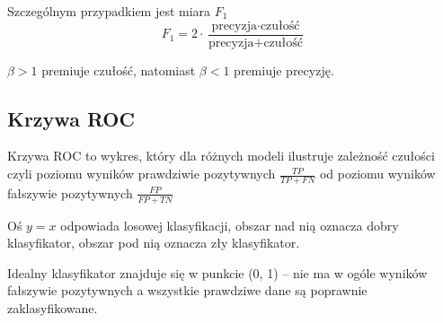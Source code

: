 Szczególnym przypadkiem jest miara \( F_1 \)
\[
	F_1 = 2 \cdot \frac{\text{precyzja} \cdot \text{czułość}}{\text{precyzja} + \text{czułość}}
\]

\( \beta > 1 \) premiuje czułość, natomiast \( \beta < 1 \) premiuje precyzję.

\subsection{Krzywa ROC}

Krzywa ROC to wykres, który dla różnych modeli ilustruje zależność czułości czyli poziomu wyników prawdziwie pozytywnych \( \frac{TP}{TP + FN} \) od poziomu wyników fałszywie pozytywnych \( \frac{FP}{FP + TN} \)

Oś \( y = x \) odpowiada losowej klasyfikacji, obszar nad nią oznacza dobry klasyfikator, obszar pod nią oznacza zły klasyfikator.

Idealny klasyfikator znajduje się w punkcie (0, 1) -- nie ma w ogóle wyników fałszywie pozytywnych a wszystkie prawdziwe dane są poprawnie zaklasyfikowane.
